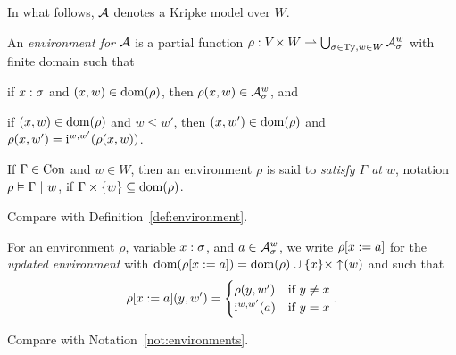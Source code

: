 In what follows, $\struct{A}$ denotes a Kripke model over $W$.

\begin{defn}[Environment]
\hfill \vspace{-6pt}
\begin{enum}
\item An \emph{environment for $\struct{A}$} is a partial function $\rho : \cartprod{\Var}{W} \pto \bigcup_{\sigma \in \Ty, w \in W}{\kscomp{\struct{A}}{\sigma}{w}}$ with finite domain such that
\begin{items}
    \item if $\typedvar{x}{\sigma}$ and $(x, w) \in \dom{\rho}$, then $\rho(x, w) \in \kscomp{\struct{A}}{\sigma}{w}$, and
    \item if $(x, w) \in \dom{\rho}$ and $w \le w'$, then $(x, w') \in \dom{\rho}$ and $\rho(x, w') = \kstran[][w,w'](\rho(x, w))$.
\end{items}
\item If $\Gamma \in \Con$ and $w \in W$, then an environment $\rho$ is said to \emph{satisfy $\Gamma$ at $w$}, notation $\ctypedenv{\rho}{\Gamma}{w}$, if $\cartprod{\Gamma}{\singset[w]} \subs \dom{\rho}$.
\end{enum}
\end{defn}
\begin{rem}
Compare with Definition~\ref{def:environment}.
\end{rem}


\begin{notn}
For an environment $\rho$, variable $\typedvar{x}{\sigma}$, and $a \in \kscomp{\struct{A}}{\sigma}{w}$, we write $\kupdenv{\rho}{x}{a}$ for the \emph{updated environment} with $\dom{\kupdenv{\rho}{x}{a}} = \dom{\rho} \cup \cartprod{\singset[x]}{\upset{w}}$ and such that
\[ \kupdenv{\rho}{x}{a}(y, w') =
    \begin{cases}
    \rho(y, w') & \text{if } y \ne x \\
    \kstran[][w,w'](a) & \text{if } y = x
    \end{cases}. \]
\end{notn}
\begin{rem}
Compare with Notation~\ref{not:environments}.
\end{rem}

